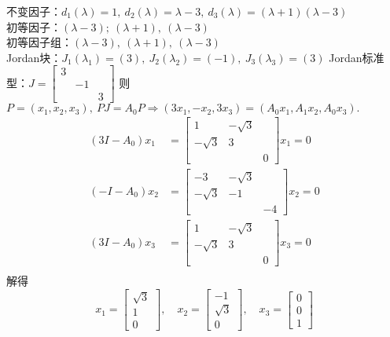 \documentclass[12pt, a4paper, oneside, fontset=none]{ctexart}
\begin{document}
不变因子：$d_1(\lambda) = 1,\ d_2(\lambda) = \lambda - 3,\ d_3(\lambda) = (\lambda + 1)(\lambda -3)$ \\
初等因子：$(\lambda - 3);\ (\lambda + 1),\ (\lambda - 3)$ \\
初等因子组：$(\lambda - 3),\ (\lambda + 1),\ (\lambda - 3)$ \\
Jordan块：$J_1(\lambda_1) = (3),\ J_2(\lambda_2) = (-1),\ J_3(\lambda_3) = (3)$
Jordan标准型：$J = \begin{bmatrix}
        3 &    &   \\
          & -1 &   \\
          &    & 3
    \end{bmatrix}$
则$P = (x_1,x_2,x_3),\ PJ = A_0P \Rightarrow (3x_1,-x_2,3x_3) = (A_0x_1,A_1x_2,A_0x_3).$
\begin{align*}
    (3I - A_0)x_1 & = \begin{bmatrix}
                          1         & -\sqrt{3} &   \\
                          -\sqrt{3} & 3         &   \\
                                    &           & 0
                      \end{bmatrix}x_1 = 0  \\
    (-I - A_0)x_2 & = \begin{bmatrix}
                          -3        & -\sqrt{3} &    \\
                          -\sqrt{3} & -1        &    \\
                                    &           & -4
                      \end{bmatrix}x_2 = 0 \\
    (3I - A_0)x_3 & = \begin{bmatrix}
                          1         & -\sqrt{3} &   \\
                          -\sqrt{3} & 3         &   \\
                                    &           & 0
                      \end{bmatrix}x_3 = 0  \\
\end{align*}
解得
\[
    x_1 = \begin{bmatrix}
        \sqrt{3} \\
        1        \\
        0
    \end{bmatrix},\quad x_2 = \begin{bmatrix}
        -1       \\
        \sqrt{3} \\
        0
    \end{bmatrix},\quad x_3 = \begin{bmatrix}
        0 \\
        0 \\
        1
    \end{bmatrix}
\]
\end{document}
